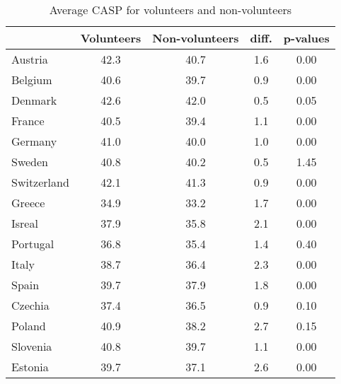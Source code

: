 \begin{table}[htbp]
\caption{\label{clabel} Average CASP for volunteers and non-volunteers}\centering\medskip
\begin{tabular}{lcccc} \hline \hline
 & Volunteers  & Non-volunteers  & diff.  & p-values  \\  \hline 
Austria &      42.3 &      40.7 &       1.6 &      0.00 \\  
Belgium &      40.6 &      39.7 &       0.9 &      0.00 \\  
Denmark &      42.6 &      42.0 &       0.5 &      0.05 \\  
France &      40.5 &      39.4 &       1.1 &      0.00 \\  
Germany &      41.0 &      40.0 &       1.0 &      0.00 \\  
Sweden &      40.8 &      40.2 &       0.5 &      1.45 \\  
Switzerland &      42.1 &      41.3 &       0.9 &      0.00 \\  
Greece &      34.9 &      33.2 &       1.7 &      0.00 \\  
Isreal &      37.9 &      35.8 &       2.1 &      0.00 \\  
Portugal &      36.8 &      35.4 &       1.4 &      0.40 \\  
Italy &      38.7 &      36.4 &       2.3 &      0.00 \\  
Spain &      39.7 &      37.9 &       1.8 &      0.00 \\  
Czechia &      37.4 &      36.5 &       0.9 &      0.10 \\  
Poland &      40.9 &      38.2 &       2.7 &      0.15 \\  
Slovenia &      40.8 &      39.7 &       1.1 &      0.00 \\  
Estonia &      39.7 &      37.1 &       2.6 &      0.00 \\  
\hline \hline \end{tabular}
\end{table}
